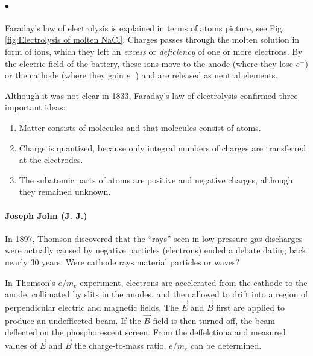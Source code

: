         \paragraph{$\bullet$} Faraday’s law of electrolysis is explained in terms of atoms picture, 
        see Fig.\eqref{fig:Electrolysis of molten NaCl}. Charges passes through the molten solution in form of ions, which they left
        an \textit{excess} or \textit{deficiency} of one or more electrons. By the electric field of the battery, these ions move to
        the anode (where they lose $e^-$) or the cathode (where they gain $e^-$) and are released as neutral elements.

        \starpar Although it was not clear in 1833, Faraday’s law of electrolysis confirmed three important ideas:
        {\small \begin{enumerate}
            \item Matter consists of molecules and that molecules consist of atoms.
            \item Charge is quantized, because only integral numbers of charges are transferred at the electrodes.
            \item The subatomic parts of atoms are positive and negative charges, although they remained unknown.
        \end{enumerate}}

        \paragraph{Joseph John (J. J.)} In 1897, Thomson discovered that the “rays” seen in low-pressure 
        gas discharges were actually caused by negative particles (electrons) ended a debate dating back nearly 30 years:
        Were cathode rays material particles or waves?

        \bulletpar In Thomson's $e/m_e$ experiment, electrons are accelerated from the cathode to the anode, collimated by slits in 
        the anodes, and then allowed to drift into a region of perpendicular electric and magnetic fields.
        The $\vec{E}$ and $\vec{B}$ first are applied to produce an undefflected beam. If the $\vec{B}$ field is then turned off, 
        the beam deflected on the phosphorescent screen. From the deffelctiona and measured values of $\vec{E}$ and $\vec{B}$ the 
        charge-to-mass ratio, $e/m_e$ can be determined.


